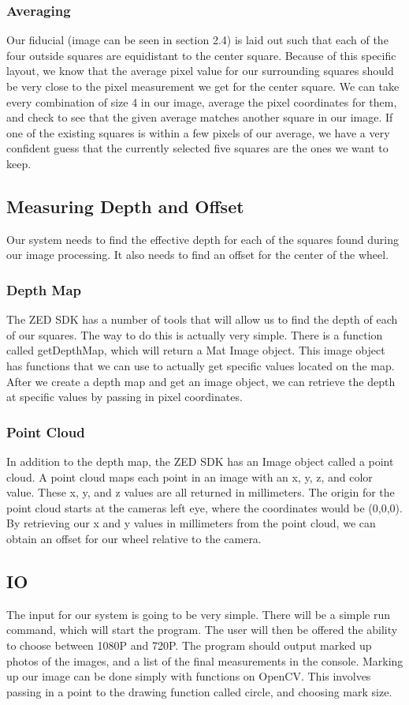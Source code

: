 \documentclass[onecolumn, draftclsnofoot,10pt, compsoc]{IEEEtran}
\begin{document}
\subsubsection{Averaging}
Our fiducial (image can be seen in section 2.4) is laid out such that each of the four outside squares are equidistant to the center square.  Because of this specific layout, we know that the average pixel value for our surrounding squares should be very close to the pixel measurement we get for the center square.  We can take every combination of size 4 in our image, average the pixel coordinates for them, and check to see that the given average matches another square in our image.  If one of the existing squares is within a few pixels of our average, we have a very confident guess that the currently selected five squares are the ones we want to keep.

\subsection{Measuring Depth and Offset}
Our system needs to find the effective depth for each of the squares found during our image processing. It also needs to find an offset for the center of the wheel.

\subsubsection{Depth Map}
The ZED SDK has a number of tools that will allow us to find the depth of each of our squares.  The way to do this is actually very simple.  There is a function called getDepthMap, which will return a Mat Image object.  This image object has functions that we can use to actually get specific values located on the map.  After we create a depth map and get an image object, we can retrieve the depth at specific values by passing in pixel coordinates.

\subsubsection{Point Cloud}
In addition to the depth map, the ZED SDK has an Image object called a point cloud.  A point cloud maps each point in an image with an x, y, z, and color value.  These x, y, and z values are all returned in millimeters.  The origin for the point cloud starts at the cameras left eye, where the coordinates would be (0,0,0).  By retrieving our x and y values in millimeters from the point cloud, we can obtain an offset for our wheel relative to the camera.


\subsection{IO}
The input for our system is going to be very simple.  There will be a simple run command, which will start the program.  The user will then be offered the ability to choose between 1080P and 720P. The program should output marked up photos of the images, and a list of the final measurements in the console.  Marking up our image can be done simply with functions on OpenCV.  This involves passing in a point to the drawing function called circle, and choosing mark size.
\end{document}
